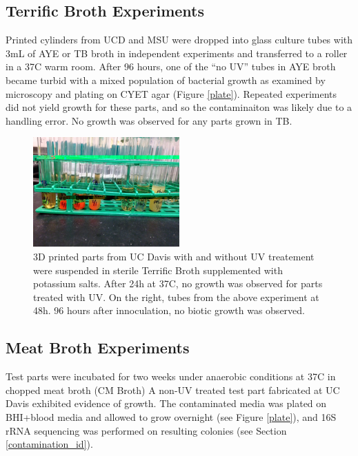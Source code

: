 \documentclass[fleqn,10pt]{wlpeerj}
\begin{document}
\subsection{Terrific Broth Experiments}

Printed cylinders from UCD and MSU were dropped into glass culture tubes with
3mL of AYE or TB broth in independent experiments and transferred to a roller
in a 37C warm room. After 96 hours, one of the ``no UV'' tubes in AYE broth
became turbid with a mixed population of bacterial growth as examined by
microscopy and plating on CYET agar (Figure \ref{plate}). Repeated experiments
did not yield growth for these parts, and so the contaminaiton was likely due
to a handling error. No growth was observed for any parts grown in TB.

\begin{figure}[!h]
  \centering
    \includegraphics[width=0.5\textwidth]{Fig7}
    
    \caption{3D printed parts from UC Davis with and without UV treatement
    were suspended in sterile Terrific Broth supplemented with potassium
    salts. After 24h at 37C, no growth was observed for parts treated with
    UV. On the right, tubes from the above experiment at 48h. 96 hours after
    innoculation, no biotic growth was observed.}

\end{figure}

\subsection{Meat Broth Experiments}\label{meat_broth}

Test parts were incubated for two weeks under anaerobic conditions at 37C in
chopped meat broth (CM Broth) \cite{seaweed_human_gut} A non-UV treated test
part fabricated at UC Davis exhibited evidence of growth. The contaminated
media was plated on BHI+blood media and allowed to grow overnight (see Figure
\ref{plate}), and 16S rRNA sequencing was performed on resulting colonies (see
Section \ref{contamination_id}).
\end{document}
